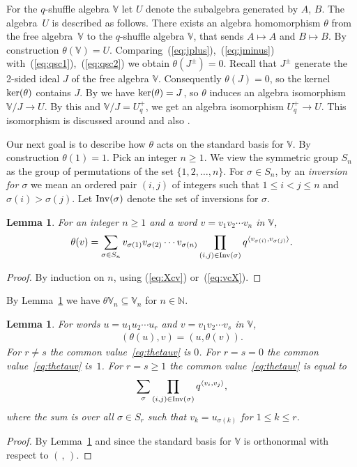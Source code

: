\documentclass[pdftex]{sigma}
\numberwithin{equation}{section}
\newtheorem{Lemma}[Theorem]{Lemma}
\begin{document}
For the $q$-shuffle algebra $\mathbb V$ let $U$ denote the
subalgebra generated by $A$, $B$. The algebra~$U$ is described as follows.
There exists an algebra homomorphism $\theta$ from
the free algebra~$\mathbb V$ to the $q$-shuffle algebra $\mathbb V$, that sends
$A\mapsto A$ and $B\mapsto B$. By construction $\theta(\mathbb V)=U$.
Comparing~(\ref{eq:jplus}),~(\ref{eq:jminus}) with~(\ref{eq:qsc1}),~(\ref{eq:qsc2})
 we obtain $\theta(J^\pm)=0$.
Recall that $J^\pm$ generate the 2-sided ideal $J$ of
the free algebra $\mathbb V$. Consequently $\theta (J)=0$,
so the kernel ${\rm ker}(\theta)$ contains $J$.
 By
\cite[Theorem~15]{rosso} we have
 ${\rm ker}(\theta)=J$,
so $\theta$ induces an algebra isomorphism $\mathbb V/J\to U$.
By this and $\mathbb V/J=U^+_q$, we get an algebra
isomorphism $U^+_q\to U$.
This isomorphism is discussed
around \cite[Theorem~15]{rosso} and also \cite[p.~696]{leclerc}.

Our next goal is to describe how $\theta$ acts on the
standard basis for $\mathbb V$.
By construction $\theta(1)=1$.
Pick an integer $n\geq 1$.
We view the symmetric group $S_n$
as the group of permutations of the set
$\lbrace 1,2,\ldots, n\rbrace$. For $\sigma \in S_n$, by an
{\it inversion
for $\sigma$} we mean an ordered pair $(i,j)$ of integers
such that $1 \leq i< j \leq n$ and $\sigma(i) > \sigma(j)$.
Let ${\rm Inv}(\sigma)$ denote the set of inversions for $\sigma$.

\begin{Lemma}\label{lem:thform}For an integer $n\geq 1$ and a word $v=v_1 v_2 \cdots v_n$ in $\mathbb V$,
\begin{gather*}%
\theta(v) =\sum_{\sigma \in S_n}v_{\sigma(1)}v_{\sigma(2)} \cdots v_{\sigma(n)} \prod_{(i,j)\in {\rm Inv}(\sigma)} q^{\langle v_{\sigma(i)}, v_{\sigma(j)}\rangle}.
\end{gather*}
\end{Lemma}
\begin{proof}By induction on $n$, using (\ref{eq:Xcv}) or~(\ref{eq:vcX}).
\end{proof}

By Lemma~\ref{lem:thform} we have $\theta \mathbb V_n \subseteq \mathbb V_n $ for $n \in \mathbb N$.

\begin{Lemma}\label{lem:uvtheta}For words $u=u_1u_2\cdots u_r$ and $v=v_1v_2\cdots v_s$ in $\mathbb V$,
\begin{gather}
(\theta(u),v)= (u, \theta(v)).\label{eq:thetauv}
\end{gather}
For $r\not=s$ the common value~\eqref{eq:thetauv} is $0$. For $r=s=0$ the common value~\eqref{eq:thetauv} is~$1$. For $r=s\geq 1$ the common value~\eqref{eq:thetauv}
is equal to
\begin{gather*}
 \sum_{\sigma}\prod_{(i,j)\in {\rm Inv}(\sigma)}q^{\langle v_i, v_j \rangle},
\end{gather*}
where the sum is over all $\sigma \in S_r$ such that $v_k = u_{\sigma(k)}$ for $1 \leq k \leq r$.
\end{Lemma}
\begin{proof} By Lemma~\ref{lem:thform} and since the standard basis for $\mathbb V$ is orthonormal with respect to $(\,,\,)$.
\end{proof}
\end{document}
